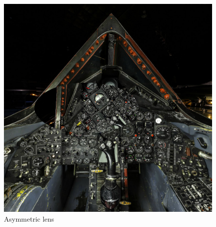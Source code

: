 \documentclass[12pt,letterpaper]{article}
\begin{document}
\begin{figure}[!h]
    \centering
    \includegraphics[width=1.0\textwidth]{img/asymmetric.png}
    \caption{Asymmetric lens}
\end{figure}
\end{document}
